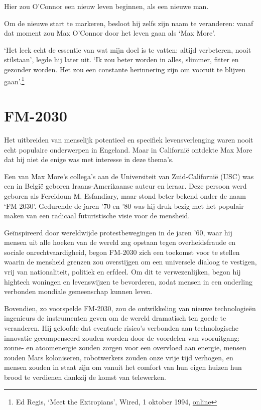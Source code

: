 \documentclass[
  a5paper,
  smalldemyvopaper,11pt,twoside,onecolumn,openright,extrafontsizes]{memoir}
\begin{document}
Hier zou O'Connor een nieuw leven beginnen, als een nieuwe man.

Om de nieuwe start te markeren, besloot hij zelfs zijn naam te
veranderen: vanaf dat moment zou Max O'Connor door het leven gaan als
`Max More'.

`Het leek echt de essentie van wat mijn doel is te vatten: altijd
verbeteren, nooit stilstaan', legde hij later uit. `Ik zou beter worden
in alles, slimmer, fitter en gezonder worden. Het zou een constante
herinnering zijn om vooruit te blijven gaan'.\footnote{Ed Regis, `Meet
  the Extropians', Wired, 1 oktober 1994,
  \href{https://www.wired.com/1994/10/extropians/}{online}}

\section{FM-2030}\label{fm-2030}

Het uitbreiden van menselijk potentieel en specifiek levensverlenging
waren nooit echt populaire onderwerpen in Engeland. Maar in Californië
ontdekte Max More dat hij niet de enige was met interesse in deze
thema's.

Een van Max More's collega's aan de Universiteit van Zuid-Californië
(USC) was een in België geboren Iraans-Amerikaanse auteur en leraar.
Deze persoon werd geboren als Fereidoun M. Esfandiary, maar stond beter
bekend onder de naam `FM-2030'. Gedurende de jaren '70 en '80 was hij
druk bezig met het populair maken van een radicaal futuristische visie
voor de mensheid.

Geïnspireerd door wereldwijde protestbewegingen in de jaren '60, waar
hij mensen uit alle hoeken van de wereld zag opstaan tegen
overheidsfraude en sociale onrechtvaardigheid, begon FM-2030 zich een
toekomst voor te stellen waarin de mensheid grenzen zou overstijgen om
een universele dialoog te vestigen, vrij van nationaliteit, politiek en
erfdeel. Om dit te verwezenlijken, begon hij hightech woningen en
levenswijzen te bevorderen, zodat mensen in een onderling verbonden
mondiale gemeenschap kunnen leven.

Bovendien, zo voorspelde FM-2030, zou de ontwikkeling van nieuwe
technologieën ingenieurs de instrumenten geven om de wereld dramatisch
ten goede te veranderen. Hij geloofde dat eventuele risico's verbonden
aan technologische innovatie gecompenseerd zouden worden door de
voordelen van vooruitgang: zonne- en atoomenergie zouden zorgen voor een
overvloed aan energie, mensen zouden Mars koloniseren, robotwerkers
zouden onze vrije tijd verhogen, en mensen zouden in staat zijn om
vanuit het comfort van hun eigen huizen hun brood te verdienen dankzij
de komst van telewerken.
\end{document}
